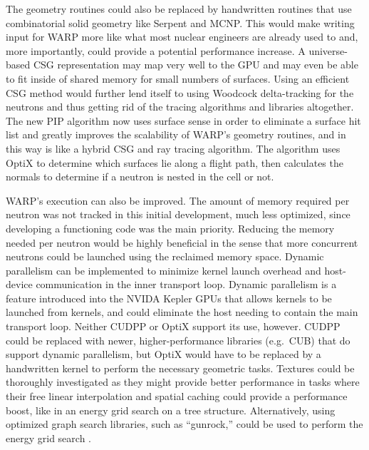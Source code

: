 \documentclass[preprint,12pt]{elsarticle}
\begin{document}
The geometry routines could also be replaced by handwritten routines that use combinatorial solid geometry like Serpent and MCNP.  This would make writing input for WARP more like what most nuclear engineers are already used to and, more importantly, could provide a potential performance increase.  A universe-based CSG representation may map very well to the GPU and may even be able to fit inside of shared memory for small numbers of surfaces.  Using an efficient CSG method would further lend itself to using Woodcock delta-tracking for the neutrons and thus getting rid of the tracing algorithms and libraries altogether.   The new PIP algorithm now uses surface sense in order to eliminate a surface hit list and greatly improves the scalability of WARP's geometry routines, and in this way is like a hybrid CSG and ray tracing algorithm.  The algorithm uses OptiX to determine which surfaces lie along a flight path, then calculates the normals to determine if a neutron is nested in the cell or not.

WARP's execution can also be improved.  The amount of memory required per neutron was not tracked in this initial development, much less optimized, since developing a functioning code was the main priority.  Reducing the memory needed per neutron would be highly beneficial in the sense that more concurrent neutrons could be launched using the reclaimed memory space.  Dynamic parallelism can be implemented to minimize kernel launch overhead and host-device communication in the inner transport loop.  Dynamic parallelism is a feature introduced into the NVIDA Kepler GPUs that allows kernels to be launched from kernels, and could eliminate the host needing to contain the main transport loop.  Neither CUDPP or OptiX support its use, however.  CUDPP could be replaced with newer, higher-performance libraries (e.g.\ CUB) that do support dynamic parallelism, but OptiX would have to be replaced by a handwritten kernel to perform the necessary geometric tasks.  Textures could be thoroughly investigated as they might provide better performance in tasks where their free linear interpolation and spatial caching could provide a performance boost, like in an energy grid search on a tree structure.   Alternatively, using optimized graph search libraries, such as ``gunrock,'' could be used to perform the energy grid search \cite{gunrock}.

\end{document}
